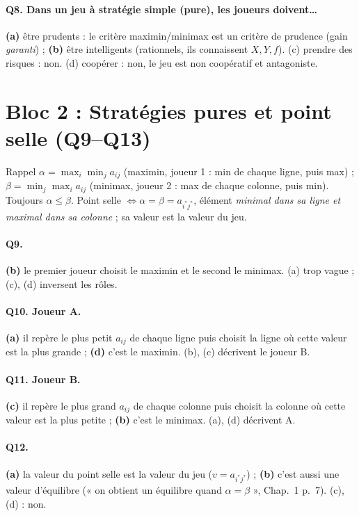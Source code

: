 \documentclass[11pt,a4paper]{article}
\newcommand{\bon}[1]{\textcolor{green!50!black}{\textbf{#1}}}
\newcommand{\faux}[1]{\textcolor{red!70!black}{#1}}
\begin{document}
\paragraph{Q8. Dans un jeu à stratégie simple (pure), les joueurs doivent\dots}
\bon{(a)} être prudents : le critère maximin/minimax est un critère de prudence (gain \emph{garanti}) ; \bon{(b)} être intelligents (rationnels, ils connaissent $X,Y,f$). \faux{(c)} prendre des risques : non. \faux{(d)} coopérer : non, le jeu est non coopératif et antagoniste.

\section*{Bloc 2 : Stratégies pures et point selle (Q9--Q13)}

\begin{propbox}{Rappel}
$\alpha=\max_i\min_j a_{ij}$ (maximin, joueur 1 : min de chaque ligne, puis max) ; $\beta=\min_j\max_i a_{ij}$ (minimax, joueur 2 : max de chaque colonne, puis min). Toujours $\alpha\le\beta$. Point selle $\iff\alpha=\beta=a_{i^*j^*}$, élément \emph{minimal dans sa ligne et maximal dans sa colonne} ; sa valeur est la valeur du jeu.
\end{propbox}

\paragraph{Q9.} \bon{(b)} le premier joueur choisit le maximin et le second le minimax. \faux{(a)} trop vague ; \faux{(c)}, \faux{(d)} inversent les rôles.

\paragraph{Q10. Joueur A.} \bon{(a)} il repère le plus petit $a_{ij}$ de chaque ligne puis choisit la ligne où cette valeur est la plus grande ; \bon{(d)} c'est le maximin. \faux{(b)}, \faux{(c)} décrivent le joueur B.

\paragraph{Q11. Joueur B.} \bon{(c)} il repère le plus grand $a_{ij}$ de chaque colonne puis choisit la colonne où cette valeur est la plus petite ; \bon{(b)} c'est le minimax. \faux{(a)}, \faux{(d)} décrivent A.

\paragraph{Q12.} \bon{(a)} la valeur du point selle est la valeur du jeu ($v=a_{i^*j^*}$) ; \bon{(b)} c'est aussi une valeur d'équilibre (« on obtient un équilibre quand $\alpha=\beta$ », Chap.~1 p.~7). \faux{(c)}, \faux{(d)} : non.
\end{document}
